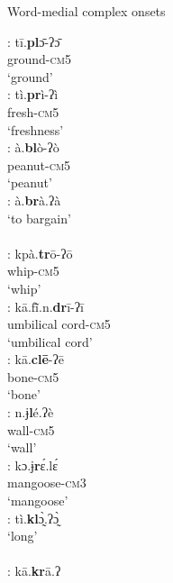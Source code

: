 \documentclass[output=paper]{langscibook}
\begin{document}
 \begin{exe}
     \ex Word-medial complex onsets \label{ex:traore:wordMedialComplexOnsets:15}
    \begin{multicols}{2}
     \begin{xlisti}
        \ex \glll [pl]:    tī.\textbf{pl}ɔ̄-ʔɔ̄ \\
            {}  ground-\textsc{cm}5\\
            {} `ground'\\
        \ex \glll [pr]:     tì.\textbf{pr}ì-ʔì\\
            {}  fresh-\textsc{cm}5\\
            {} `freshness'\\
        \ex \glll [bl]:    à.\textbf{bl}ò-ʔò\\
            {}      peanut-\textsc{cm}5\\
            {} `peanut'\\
        \ex  \glll [br]:    à.\textbf{br}à.ʔà\\
            {}  {`to bargain'}\\
            {}  {}\\
        \ex \glll [tr]:    kpà.\textbf{tr}ō-ʔō\\
            {}   whip-\textsc{cm}5\\
            {}  `whip'\\
        \ex \glll [dr]: kā.fĩ̄.n.\textbf{dr}ī-ʔī\\
            {}  {umbilical cord-\textsc{cm}5}\\
            {}  {`umbilical cord'}\\
        \ex \glll  [cl]:   kā.\textbf{clē}{}-ʔē \\
            {}  bone-\textsc{cm}5\\
            {} `bone'\\
        \ex \glll [ɉl]:     n.ɉ\textbf{l}é.ʔè\\
            {}   wall-\textsc{cm}5\\
            {}  `wall'\\
        \ex  \glll [ɉr]:      kɔ.ɉ\textbf{r}ɛ́.lɛ́ \\
            {}  mangoose-\textsc{cm}3\\
            {}  `mangoose'\\
        \ex \glll [kl]:    tì.\textbf{kl}ɔ̰̀.ʔɔ̰̀\\
            {}  `long'\\
            {}  {}\\
        \ex  \glll [kr]:     kā.\textbf{kr}ā.ʔ\\

\end{xlisti}
\end{multicols}
\end{exe}
\end{document}
